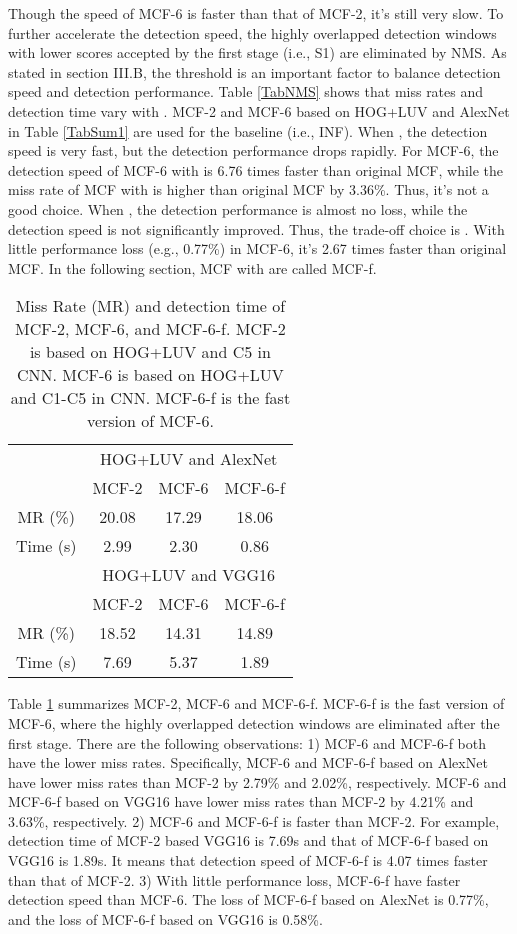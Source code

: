\documentclass[journal]{IEEEtran}
\begin{document}
Though the speed of MCF-6 is faster than that of MCF-2, it's still very slow. To further accelerate the detection speed, the highly overlapped detection windows with lower scores accepted by the first stage (i.e., S1) are eliminated by NMS. As stated in section III.B, the threshold  is an important factor to balance detection speed and detection performance. Table \ref{TabNMS} shows that miss rates and detection time vary with . MCF-2 and MCF-6 based on HOG+LUV and AlexNet in Table \ref{TabSum1} are used for the baseline (i.e., INF). When , the detection speed is very fast, but the detection performance drops rapidly. For MCF-6, the detection speed of MCF-6 with  is 6.76 times faster than original MCF, while the miss rate of MCF with  is higher than original MCF by 3.36\%. Thus, it's not a good choice. When  , the detection performance is almost no loss, while the detection speed is not significantly improved. Thus, the trade-off choice is . With little performance loss (e.g., 0.77\%) in MCF-6, it's 2.67 times faster than original MCF. In the following section, MCF with   are called MCF-f.

\begin{table}[!t]
\centering
\renewcommand{\arraystretch}{1.3}
\caption{Miss Rate (MR) and detection time of MCF-2, MCF-6, and MCF-6-f. MCF-2 is based on HOG+LUV and C5 in CNN. MCF-6 is based on HOG+LUV and C1-C5 in CNN. MCF-6-f is the fast version of MCF-6.}
\begin{tabular*}{8.5cm}{@{\extracolsep{\fill}}cccc}
\hline
 & \multicolumn{3}{c}{HOG+LUV and AlexNet}\\
\cline{2-4}
 & MCF-2& MCF-6& MCF-6-f\\
\hline
MR (\%)& 20.08& 17.29& 18.06\\
Time (s)& 2.99& 2.30& 0.86\\
\hline
\hline
 & \multicolumn{3}{c}{HOG+LUV and VGG16}\\
\cline{2-4}
 & MCF-2& MCF-6& MCF-6-f\\
\hline
MR (\%)& 18.52& 14.31& 14.89\\
Time (s)& 7.69& 5.37& 1.89\\
\hline
\end{tabular*}
\label{TabSum2}
\end{table}


Table \ref{TabSum2} summarizes MCF-2, MCF-6 and MCF-6-f. MCF-6-f is the fast version of MCF-6, where the highly overlapped detection windows are eliminated after the first stage. There are the following observations: 1) MCF-6 and MCF-6-f both have the lower miss rates. Specifically, MCF-6 and MCF-6-f based on AlexNet have lower miss rates than MCF-2 by 2.79\% and 2.02\%, respectively. MCF-6 and MCF-6-f based on VGG16 have lower miss rates than MCF-2 by 4.21\% and 3.63\%, respectively. 2) MCF-6 and MCF-6-f is faster than MCF-2. For example, detection time of MCF-2 based VGG16 is 7.69s and that of MCF-6-f based on VGG16 is 1.89s. It means that detection speed of MCF-6-f is 4.07 times faster than that of MCF-2. 3) With little performance loss, MCF-6-f have faster detection speed than MCF-6. The loss of MCF-6-f based on AlexNet is 0.77\%, and the loss of MCF-6-f based on VGG16 is 0.58\%. 
\end{document}
